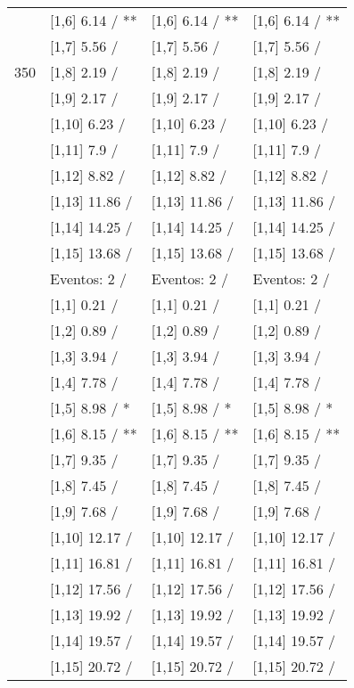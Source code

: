 \begin{table}
\begin{tabular}[t]{llll}
 & {}[1,6] 6.14  / ** & {}[1,6] 6.14  / ** & {}[1,6] 6.14  / **\\
 & {}[1,7] 5.56  / & {}[1,7] 5.56  / & {}[1,7] 5.56  /\\
350 & {}[1,8] 2.19  / & {}[1,8] 2.19  / & {}[1,8] 2.19  /\\
\addlinespace
 & {}[1,9] 2.17  / & {}[1,9] 2.17  / & {}[1,9] 2.17  /\\
 & {}[1,10] 6.23  / & {}[1,10] 6.23  / & {}[1,10] 6.23  /\\
 & {}[1,11] 7.9  / & {}[1,11] 7.9  / & {}[1,11] 7.9  /\\
 & {}[1,12] 8.82  / & {}[1,12] 8.82  / & {}[1,12] 8.82  /\\
 & {}[1,13] 11.86  / & {}[1,13] 11.86  / & {}[1,13] 11.86  /\\
\addlinespace
 & {}[1,14] 14.25  / & {}[1,14] 14.25  / & {}[1,14] 14.25  /\\
 & {}[1,15] 13.68  / & {}[1,15] 13.68  / & {}[1,15] 13.68  /\\
 & Eventos:  2 / & Eventos:  2 / & Eventos:  2 /\\
 & {}[1,1] 0.21  / & {}[1,1] 0.21  / & {}[1,1] 0.21  /\\
 & {}[1,2] 0.89  / & {}[1,2] 0.89  / & {}[1,2] 0.89  /\\
\addlinespace
 & {}[1,3] 3.94  / & {}[1,3] 3.94  / & {}[1,3] 3.94  /\\
 & {}[1,4] 7.78  / & {}[1,4] 7.78  / & {}[1,4] 7.78  /\\
 & {}[1,5] 8.98  / * & {}[1,5] 8.98  / * & {}[1,5] 8.98  / *\\
 & {}[1,6] 8.15  / ** & {}[1,6] 8.15  / ** & {}[1,6] 8.15  / **\\
 & {}[1,7] 9.35  / & {}[1,7] 9.35  / & {}[1,7] 9.35  /\\
\addlinespace
500 & {}[1,8] 7.45  / & {}[1,8] 7.45  / & {}[1,8] 7.45  /\\
 & {}[1,9] 7.68  / & {}[1,9] 7.68  / & {}[1,9] 7.68  /\\
 & {}[1,10] 12.17  / & {}[1,10] 12.17  / & {}[1,10] 12.17  /\\
 & {}[1,11] 16.81  / & {}[1,11] 16.81  / & {}[1,11] 16.81  /\\
 & {}[1,12] 17.56  / & {}[1,12] 17.56  / & {}[1,12] 17.56  /\\
\addlinespace
 & {}[1,13] 19.92  / & {}[1,13] 19.92  / & {}[1,13] 19.92  /\\
 & {}[1,14] 19.57  / & {}[1,14] 19.57  / & {}[1,14] 19.57  /\\
 & {}[1,15] 20.72  / & {}[1,15] 20.72  / & {}[1,15] 20.72  /\\
\bottomrule
\end{tabular}
\end{table}
